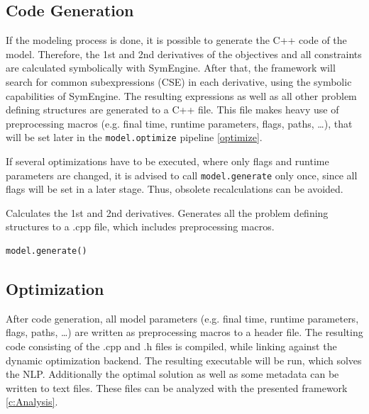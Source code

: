 \documentclass[12pt]{article}
\begin{document}
\subsection{Code Generation}

If the modeling process is done, it is possible to generate the C++ code of the model.
Therefore, the 1st and 2nd derivatives of the objectives and all constraints are calculated symbolically with SymEngine. After that, the framework will search for common subexpressions (CSE) in each derivative, using the symbolic capabilities of SymEngine. The resulting expressions as well as all other problem defining structures are generated to a C++ file. This file makes heavy use of preprocessing macros (e.g. final time, runtime parameters, flags, paths, \ldots), that will be set later in the \texttt{model.optimize} pipeline \ref{optimize}.   

If several optimizations have to be executed, where only flags and runtime parameters are changed, it is advised to call \texttt{model.generate} only once, since all flags will be set in a later stage. Thus, obsolete recalculations can be avoided.

\begin{mdframed}[backgroundcolor=gray!10, roundcorner=10pt,
	linewidth=1pt]
	
	Calculates the 1st and 2nd derivatives. Generates all the problem defining structures to a .cpp file, which includes preprocessing macros.
	
\begin{lstlisting}
model.generate()
\end{lstlisting}

\end{mdframed}

\subsection{Optimization}

	After code generation, all model parameters (e.g. final time, runtime parameters, flags, paths, \ldots) are written as preprocessing macros to a header file. The resulting code consisting of the .cpp and .h files is compiled, while linking against the dynamic optimization backend. The resulting executable will be run, which solves the NLP. Additionally the optimal solution as well as some metadata can be written to text files. These files can be analyzed with the presented framework \ref{c:Analysis}.  
	
\end{document}
